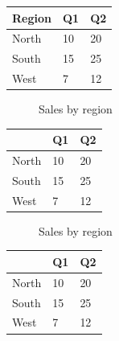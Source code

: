 \documentclass[11pt,a4paper]{article}
\begin{document}
\begin{table}[h]
\begin{tabular}{|l|l|l|}
\hline
Region & Q1 & Q2 \\ \hline
North & 10 & 20 \\ \hline
South & 15 & 25 \\ \hline
West & 7 & 12 \\ \hline
\end{tabular}
\end{table}

\begin{figure}[h]
\caption{Sales by region}
\end{figure}

\begin{table}[h]
\begin{tabular}{|l|l|l|}
\hline
 & Q1 & Q2 \\ \hline
North & 10 & 20 \\ \hline
South & 15 & 25 \\ \hline
West & 7 & 12 \\ \hline
\end{tabular}
\end{table}

\begin{figure}[h]
\caption{Sales by region}
\end{figure}

\begin{table}[h]
\begin{tabular}{|l|l|l|}
\hline
 & Q1 & Q2 \\ \hline
North & 10 & 20 \\ \hline
South & 15 & 25 \\ \hline
West & 7 & 12 \\ \hline
\end{tabular}
\end{table}
\end{document}

